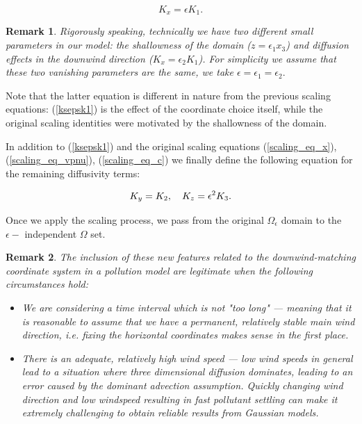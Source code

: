 \documentclass[12pt]{report}
\numberwithin{theorem}{chapter}
\numberwithin{corollary}{chapter}
\numberwithin{lemma}{chapter}
\newtheorem{remark}{Remark}
\numberwithin{remark}{chapter}
\numberwithin{definition}{chapter}
\numberwithin{prop}{chapter}
\begin{document}
\begin{equation} \label{ksepsk1} K_x = \epsilon K_1. \end{equation}

\begin{remark}
Rigorously speaking, technically we have two different small parameters in our model: the shallowness of the domain ($z = \epsilon_1 x_3$) and diffusion effects in the downwind direction ($K_x = \epsilon_2 K_1$). For simplicity we assume that these two vanishing parameters are the same, we take $\epsilon = \epsilon_1 = \epsilon_2.$
\end{remark}

Note that the latter equation is different in nature from the previous scaling equations: (\ref{ksepsk1}) is the effect of the coordinate choice itself, while the original scaling identities were motivated by the shallowness of the domain.

In addition to (\ref{ksepsk1}) and the original scaling equations (\ref{scaling_eq_x}), (\ref{scaling_eq_vpnu}), (\ref{scaling_eq_c}) we finally define the following equation for the remaining diffusivity terms:

\begin{equation} \label{scaling_eq_diffusion_dwmc}
  K_y = K_2 , \quad K_z = \epsilon^2 K_3. \\
\end{equation}

Once we apply the scaling process, we pass from the original $\Omega_\epsilon$ domain to the $\epsilon-$ independent $\Omega$ set.

\begin{remark} \normalfont
  The inclusion of these new features related to the downwind-matching coordinate system in a pollution model are legitimate when the following circumstances hold:
  \begin{itemize}
    \item We are considering a time interval which is not "too long" --- meaning that it is reasonable to assume that we have a permanent, relatively stable main wind direction, i.e. fixing the horizontal coordinates makes sense in the first place.
    \item There is an adequate, relatively high wind speed --- low wind speeds in general lead to a situation where three dimensional diffusion dominates, leading to an error caused by the dominant advection assumption. Quickly changing wind direction and low windspeed resulting in fast pollutant settling can make it extremely challenging to obtain reliable results from Gaussian models.
  \end{itemize}
\end{remark}
\end{document}
